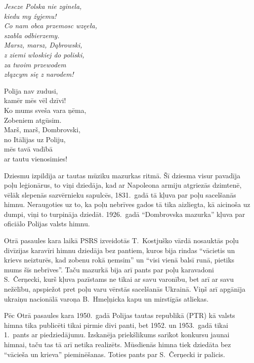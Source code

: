 \documentclass[twoside,a5paper,12pt,fleqn,openany]{extbook}
\newcommand{\pltxti}[1]{\textit{\textpolish{#1}}}
\begin{document}
\noindent
\begin{minipage}{0.45\textwidth}
\pltxti{
Jescze Polska nie zginela,\\
kiedu my źyjemu!\\
Co nam obca przemosc wzęeła,\\
szabla odbierzemy.\\
Marsz, marsz, Dąbrowski,\\
z ziemi wloskiej do poliski,\\
za twoim przewodem\\
złązcym się z narodem!}
\end{minipage}
\hspace{2em}
\begin{minipage}{0.45\textwidth}
Polija nav zudusi,\\
kamēr mēs vēl dzīvi!\\
Ko mums sveša vara ņēma,\\
Zobeniem atgūsim.\\
Marš, marš, Dombrovski,\\
no Itālijas uz Poliju,\\
mēs tavā vadībā\\
ar tautu vienosimies!
\end{minipage}

\vspace{1.5em}


Dziesmu izpildīja ar tautas mūziku mazurkas ritmā. Šī dziesma visur pavadīja poļu leģionārus, to viņi dziedāja, kad ar Napoleona armiju atgriezās dzimtenē, vēlāk slepenās sazvērnieku sapulcēs, 1831.~gadā tā kļuva par poļu sacelšanās himnu. Neraugoties uz to, ka poļu nebrīves gados tā tika aizliegta, kā aicinoša uz dumpi, viņi to turpināja dziedāt. 1926.~gadā ``Dombrovska mazurka'' kļuva par oficiālo Polijas valsts himnu.

Otrā pasaules kara laikā PSRS izveidotās T.~Kostjuško vārdā nosauktās poļu divīzijas karavīri himnu dziedāja bez pantiem, kuros bija rindas ``vācietis un krievs neizturēs, kad zobenu rokā ņemsim'' un ``visi vienā balsī runā, pietiks mums šīs nebrīves''. Taču mazurkā bija arī pants par poļu karavadoni S.~Čerņecki, kurš kļuva pazīstams ne tikai ar savu varonību, bet arī ar savu nežēlību, apspiežot pret poļu varu vērstās sacelšanās Ukrainā. Viņš arī apgānīja ukraiņu nacionālā varoņa B.~Hmeļņicka kapu un mirstīgās atliekas.

Pēc Otrā pasaules kara 1950.~gadā Polijas tautas republikā (PTR) kā valsts himna tika publicēti tikai pirmie divi panti, bet 1952. un 1953.~gadā tikai 1.~pants ar piedziedājumu. Izskanēja priekšlikums sarīkot konkursu jaunai himnai, taču tas tā arī netika realizēts. Mūsdienās himna tiek dziedāta bez ``vācieša un krieva'' pieminēšanas. Toties pants par S.~Čerņecki ir palicis.
\end{document}
